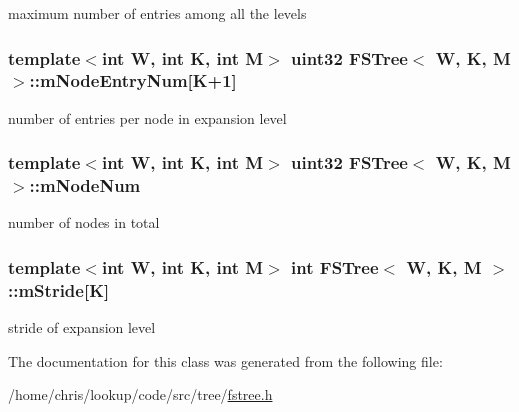 maximum number of entries among all the levels 

\hypertarget{classFSTree_a8130db6daaa9b99921230e9349a66888}{
\subsubsection[{m\-Node\-Entry\-Num}]{\setlength{\rightskip}{0pt plus 5cm}template$<$int W, int K, int M$>$ {\bf uint32} {\bf F\-S\-Tree}$<$ {\bf W}, K, M $>$\-::m\-Node\-Entry\-Num\mbox{[}K+1\mbox{]}\hspace{0.3cm}{\ttfamily [private]}}}\label{classFSTree_a8130db6daaa9b99921230e9349a66888}


number of entries per node in expansion level 

\hypertarget{classFSTree_a0630cd4bcdd55f729691e762018f4951}{
\subsubsection[{m\-Node\-Num}]{\setlength{\rightskip}{0pt plus 5cm}template$<$int W, int K, int M$>$ {\bf uint32} {\bf F\-S\-Tree}$<$ {\bf W}, K, M $>$\-::m\-Node\-Num\hspace{0.3cm}{\ttfamily [private]}}}\label{classFSTree_a0630cd4bcdd55f729691e762018f4951}


number of nodes in total 

\hypertarget{classFSTree_a463862d4c2ae3ec8a1bab6c66c3ed395}{
\subsubsection[{m\-Stride}]{\setlength{\rightskip}{0pt plus 5cm}template$<$int W, int K, int M$>$ int {\bf F\-S\-Tree}$<$ {\bf W}, K, M $>$\-::m\-Stride\mbox{[}K\mbox{]}\hspace{0.3cm}{\ttfamily [private]}}}\label{classFSTree_a463862d4c2ae3ec8a1bab6c66c3ed395}


stride of expansion level 



The documentation for this class was generated from the following file\-:\begin{DoxyCompactItemize}
\item 
/home/chris/lookup/code/src/tree/\hyperlink{fstree_8h}{fstree.\-h}\end{DoxyCompactItemize}
